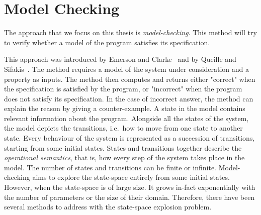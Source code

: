 \chapter{Model Checking}
\label{section:model:checking}
%
%
%

The approach that we focus on this thesis is
\emph{model-checking}.
%
%
This method will try to verify whether a model of the program
satisfies its specification.

This approach was introduced by Emerson and Clarke~\cite{CE82} and by Queille and Sifakis~\cite{QS82}. The method requires a model of the system under
consideration and a property as inputs. The method then computes and returns either "correct" when the specification is satisfied by the program, or "incorrect" when the program does not satisfy its specification. In the case of incorrect answer, the method can explain the reason by giving a counter-example. A state in the model contains relevant information about the program.
Alongside all the states of the system, the model depicts the
transitions, i.e.\ how to move from one state to another state. Every behaviour of the system is represented as a succession of transitions, starting from some initial states. States and transitions together describe the \emph{operational
  semantics}, that is, how every step of the system takes place in the model.
The number of states and transitions can be finite or infinite.
Model-checking aims to explore the state-space entirely from some initial states. However, when the state-space is of large size. It grows in-fact
exponentially with the number of parameters or the size of their
domain. Therefore, there have been several methods to address with the
state-space explosion problem.

